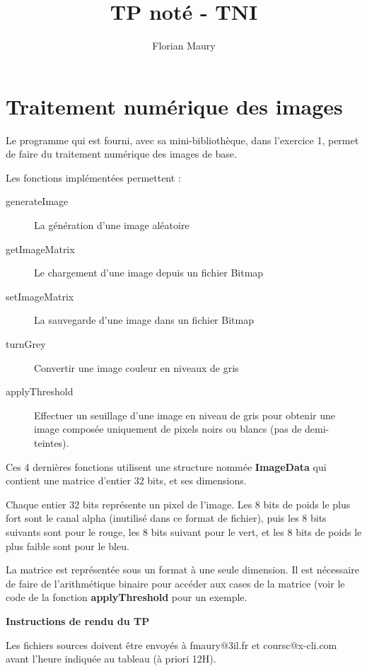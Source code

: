 \documentclass[10pt,twocolumn]{article}
\begin{document}
\title{TP noté - TNI}
\author{Florian Maury}
\date{}
\maketitle

\section{Traitement numérique des images}
Le programme qui est fourni, avec sa mini-bibliothèque, dans l'exercice 1, permet de faire du traitement numérique des images de base.
\par
Les fonctions implémentées permettent :
\begin{description}
  \item[generateImage] La génération d'une image aléatoire
  \item[getImageMatrix] Le chargement d'une image depuis un fichier Bitmap
  \item[setImageMatrix] La sauvegarde d'une image dans un fichier Bitmap
  \item[turnGrey] Convertir une image couleur en niveaux de gris
  \item[applyThreshold] Effectuer un seuillage d'une image en niveau de gris pour obtenir une image composée uniquement de pixels noirs ou blancs (pas de demi-teintes).
\end{description}
\par
Ces 4 dernières fonctions utilisent une structure nommée \textbf{ImageData} qui contient une matrice d'entier 32 bits, et ses dimensions.
\par
Chaque entier 32 bits représente un pixel de l'image. Les 8 bits de poids le plus fort sont le canal alpha (inutilisé dans ce format de fichier), puis les 8 bits suivants sont pour le rouge, les 8 bits suivant pour le vert, et les 8 bits de poids le plus faible sont pour le bleu.
\par
La matrice est représentée sous un format à une seule dimension. Il est nécessaire de faire de l'arithmétique binaire pour accéder aux cases de la matrice (voir le code de la fonction \textbf{applyThreshold} pour un exemple.


\vspace{2cm}
\par
{\Large \textbf{Instructions de rendu du TP}}
\par
Les fichiers sources doivent être envoyés à fmaury@3il.fr et coursc@x-cli.com avant l'heure indiquée au tableau (à priori 12H).
\end{document}
